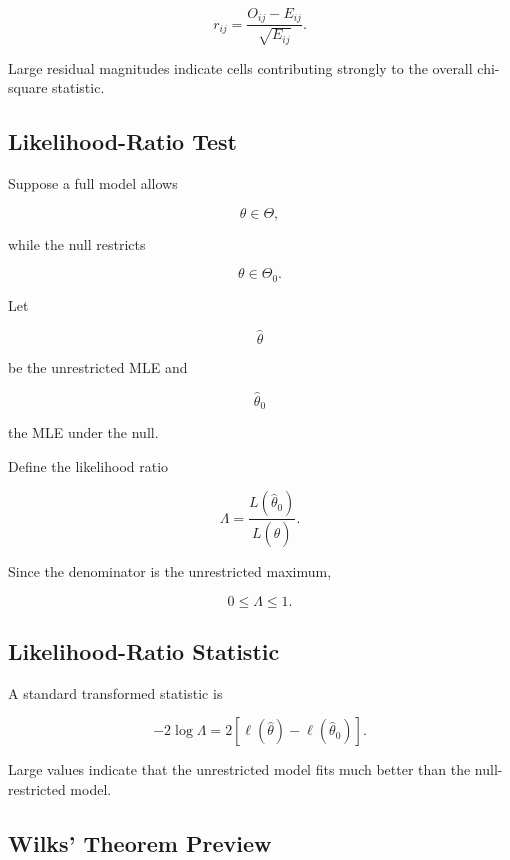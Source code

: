 \[
\boxed{
r_{ij}
=
\frac{
O_{ij}-E_{ij}
}{
\sqrt{E_{ij}}
}.
}
\]

Large residual magnitudes indicate cells contributing strongly to the
overall chi-square statistic.

\subsection{Likelihood-Ratio Test}
\label{subsec:likelihood-ratio-test}

Suppose a full model allows

\[
\theta\in\Theta,
\]

while the null restricts

\[
\theta\in\Theta_0.
\]

Let

\[
\widehat{\theta}
\]

be the unrestricted MLE and

\[
\widehat{\theta}_0
\]

the MLE under the null.

Define the likelihood ratio

\[
\boxed{
\Lambda
=
\frac{
L(\widehat{\theta}_0)
}{
L(\widehat{\theta})
}.
}
\]

Since the denominator is the unrestricted maximum,

\[
\boxed{
0\leq\Lambda\leq1.
}
\]

\subsection{Likelihood-Ratio Statistic}
\label{subsec:likelihood-ratio-statistic}

A standard transformed statistic is

\[
\boxed{
-2\log\Lambda
=
2
\left[
\ell(\widehat{\theta})
-
\ell(\widehat{\theta}_0)
\right].
}
\]

Large values indicate that the unrestricted model fits much better than
the null-restricted model.

\subsection{Wilks' Theorem Preview}
\label{subsec:wilks-theorem}

